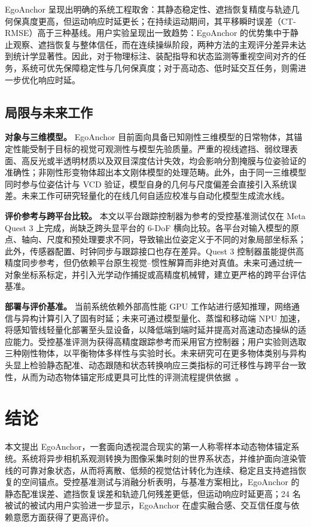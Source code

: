 \documentclass[review]{vgtc}
\begin{document}
EgoAnchor 呈现出明确的系统工程取舍：其静态稳定性、遮挡恢复精度与轨迹几何保真度更高，但运动响应时延更长；在持续运动期间，其平移瞬时误差（CT-RMSE）高于三种基线。用户实验呈现出一致趋势：EgoAnchor 的优势集中于静止观察、遮挡恢复与整体信任，而在连续操纵阶段，两种方法的主观评分差异未达到统计学显著性。因此，对于物理标注、装配指导和状态监测等重视空间对齐的任务，系统可优先保障稳定性与几何保真度；对于高动态、低时延交互任务，则需进一步优化响应时延。

\subsection{局限与未来工作}

\textbf{对象与三维模型。}
EgoAnchor 目前面向具备已知刚性三维模型的日常物体，其锚定性能受制于目标的视觉可观测性与模型先验质量。严重的视线遮挡、弱纹理表面、高反光或半透明材质以及双目深度估计失效，均会影响分割掩膜与位姿验证的准确性；非刚性形变物体超出本文刚体模型的处理范畴。此外，由于同一三维模型同时参与位姿估计与 VCD 验证，模型自身的几何与尺度偏差会直接引入系统误差。未来工作可研究轻量化的在线几何自适应校准与自动化模型生成流水线。

\textbf{评价参考与跨平台比较。}
本文以平台跟踪控制器为参考的受控基准测试仅在 Meta Quest 3 上完成，尚缺乏跨头显平台的 6-DoF 横向比较。各平台对输入模型的原点、轴向、尺度和预处理要求不同，导致输出位姿定义于不同的对象局部坐标系；此外，传感器配置、时钟同步与跟踪接口也存在差异。Quest 3 控制器虽能提供高精度同步参考，但仍依赖平台原生视觉--惯性解算而非绝对真值。未来可通过统一对象坐标系标定，并引入光学动作捕捉或高精度机械臂，建立更严格的跨平台评估基准。

\textbf{部署与评价基准。}
当前系统依赖外部高性能 GPU 工作站进行感知推理，网络通信与异构计算引入了固有时延；未来可通过模型量化、蒸馏和移动端 NPU 加速，将感知管线轻量化部署至头显设备，以降低端到端时延并提高对高速动态操纵的适应能力。受控基准评测为获得高精度跟踪参考而采用官方控制器；用户实验则选取三种刚性物体，以平衡物体多样性与实验时长。未来研究可在更多物体类别与异构头显上检验静态配准、动态跟随和状态转换响应三类指标的可迁移性与跨平台一致性，从而为动态物体锚定形成更具可比性的评测流程提供依据~\cite{cheng2024tracking,hu2024applemeta,hu2025xrrealitycheck}。

\section{结论}\label{sec:conclusion}

本文提出 EgoAnchor，一套面向透视混合现实的第一人称零样本动态物体锚定系统。系统将异步相机系观测转换为图像采集时刻的世界系状态，并维护面向渲染管线的可靠对象状态，从而将离散、低频的视觉估计转化为连续、稳定且支持遮挡恢复的空间锚点。受控基准测试与消融分析表明，与基准方案相比，EgoAnchor 的静态配准误差、遮挡恢复误差和轨迹几何残差更低，但运动响应时延更高；24 名被试的被试内用户实验进一步显示，EgoAnchor 在虚实融合感、交互信任度与依赖意愿方面获得了更高评价。
\end{document}
